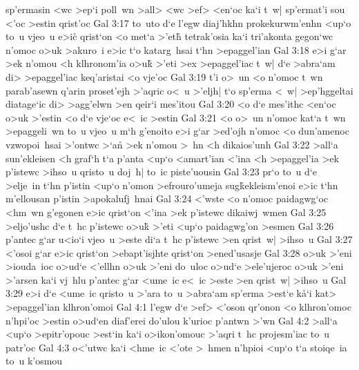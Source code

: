 sp'ermasin
<wc
>ep`i
poll~wn
>all>
<wc
>ef>
<en`oc
ka`i
t~w|
sp'ermat'i
sou
<'oc
>estin
qrist'oc\bibvsend
\vs Gal 3:17
to~uto
d`e
l'egw
diaj'hkhn
prokekurwm'enhn
<up`o
to~u
vjeo~u
e>ic\r{}
qrist`on
<o
met`a
>'eth\r{}
tetrak'osia
ka`i
tri'akonta
gegon`wc
n'omoc
o>uk
>akuro~i
e>ic
t`o
katarg~hsai
t`hn
>epaggel'ian\bibvsend
\vs Gal 3:18
e>i
g`ar
>ek
n'omou
<h
klhronom'ia
o>uk\r{}
>'eti
>ex
>epaggel'iac
t~w|
d`e
>abra`am
di>
>epaggel'iac
keq'aristai
<o
vje'oc\bibvsend
\vs Gal 3:19
t'i
o>~un
<o
n'omoc
t~wn
parab'asewn
q'arin
proset'ejh
>'aqric
o<~u
>'eljh|
t`o
sp'erma
<~w|
>ep'hggeltai
diatage`ic
di>
>agg'elwn
>en
qeir`i
mes'itou\bibvsend
\vs Gal 3:20
<o
d`e
mes'ithc
<en`oc
o>uk
>'estin
<o
d`e
vje`oc
e<~ic
>estin\bibvsend
\vs Gal 3:21
<o
o>~un
n'omoc
kat`a
t~wn
>epaggeli~wn
to~u
vjeo~u
m`h
g'enoito
e>i
g`ar
>ed'ojh
n'omoc
<o
dun'amenoc
vzwopoi~hsai
>'ontwc
>`an\r{}
>ek
n'omou
>~hn
<h
dikaios'unh\bibvsend
\vs Gal 3:22
>all`a
sun'ekleisen
<h
graf`h
t`a
p'anta
<up`o
<amart'ian
<'ina
<h
>epaggel'ia
>ek
p'istewc
>ihso~u
qristo~u
doj~h|
to~ic
piste'uousin\bibvsend
\vs Gal 3:23
pr`o
to~u
d`e
>elje~in
t`hn
p'istin
<up`o
n'omon
>efrouro'umeja
sug\r{k}ekleism'enoi
e>ic
t`hn
m'ellousan
p'istin
>apokalufj~hnai\bibvsend
\vs Gal 3:24
<'wste
<o
n'omoc
paidagwg`oc
<hm~wn
g'egonen
e>ic
qrist`on
<'ina
>ek
p'istewc
dikaiwj~wmen\bibvsend
\vs Gal 3:25
>eljo'ushc
d`e
t~hc
p'istewc
o>uk\r{}
>'eti
<up`o
paidagwg'on
>esmen\bibvsend
\vs Gal 3:26
p'antec
g`ar
u<io`i
vjeo~u
>este
di`a
t~hc
p'istewc
>en
qrist~w|
>ihso~u\bibvsend
\vs Gal 3:27
<'osoi
g`ar
e>ic
qrist`on
>ebapt'isjhte
qrist`on
>ened'usasje\bibvsend
\vs Gal 3:28
o>uk
>'eni
>iouda~ioc
o>ud`e
<'ellhn
o>uk
>'eni
do~uloc
o>ud`e
>ele'ujeroc
o>uk
>'eni
>'arsen
ka`i
vj~hlu
p'antec
g`ar
<ume~ic
e<~ic
>este
>en
qrist~w|
>ihso~u\bibvsend
\vs Gal 3:29
e>i
d`e
<ume~ic
qristo~u
>'ara
to~u
>abra`am
sp'erma
>est`e
k\r{a}`i
kat>
>epaggel'ian
klhron'omoi\bibvsend
\vs Gal 4:1
l'egw
d`e
>ef>
<'oson
qr'onon
<o
klhron'omoc
n'hpi'oc
>estin
o>ud`en
diaf'erei
do'ulou
k'urioc
p'antwn
>'wn\bibvsend
\vs Gal 4:2
>all`a
<up`o
>epitr'opouc
>est`in
ka`i
o>ikon'omouc
>'aqri
t~hc
projesm'iac
to~u
patr'oc\bibvsend
\vs Gal 4:3
o<'utwc
ka`i
<hme~ic
<'ote
>~hmen
n'hpioi
<up`o
t`a
stoiqe~ia
to~u
k'osmou
